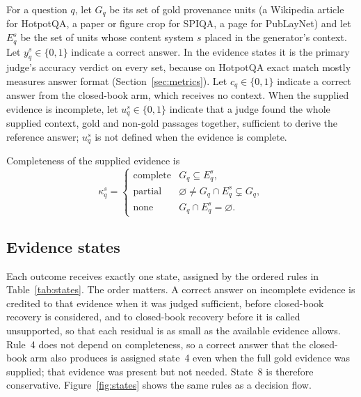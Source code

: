 \documentclass[preprint,12pt]{elsarticle}
\begin{document}
For a question $q$, let $G_q$ be its set of gold provenance units (a Wikipedia
article for HotpotQA, a paper or figure crop for SPIQA, a page for PubLayNet)
and let $E_q^{s}$ be the set of units whose content system $s$ placed in the
generator's context. Let $y_q^{s}\in\{0,1\}$ indicate a correct answer. In the
evidence states it is the primary judge's accuracy verdict on every set,
because on HotpotQA exact match mostly measures answer format
(Section~\ref{sec:metrics}). Let $c_q\in\{0,1\}$ indicate a correct answer
from the closed-book arm, which receives no context. When the supplied
evidence is incomplete, let $u_q^{s}\in\{0,1\}$ indicate that a judge found
the whole supplied context, gold and non-gold passages together, sufficient to
derive the reference answer; $u_q^{s}$ is not defined when the evidence is
complete.

Completeness of the supplied evidence is
\begin{equation}
\kappa_q^{s} =
\begin{cases}
\text{complete} & G_q \subseteq E_q^{s},\\
\text{partial}  & \varnothing \neq G_q\cap E_q^{s} \subsetneq G_q,\\
\text{none}     & G_q\cap E_q^{s} = \varnothing .
\end{cases}
\end{equation}

\subsection{Evidence states}

Each outcome receives exactly one state, assigned by the ordered rules in
Table~\ref{tab:states}. The order matters. A correct answer on incomplete
evidence is credited to that evidence when it was judged sufficient, before
closed-book recovery is considered, and to closed-book recovery before it is
called unsupported, so that each residual is as small as the available
evidence allows. Rule~4 does not depend on completeness, so a correct answer
that the closed-book arm also produces is assigned state~4 even when the full
gold evidence was supplied; that evidence was present but not needed. State~8 is therefore conservative. Figure~\ref{fig:states} shows the
same rules as a decision flow.


\end{document}
